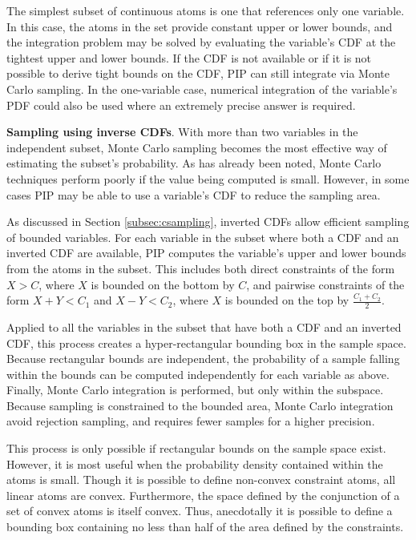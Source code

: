 The simplest subset of continuous atoms is one that references only one variable.  In this case, the atoms in the set provide constant upper or lower bounds, and the integration problem may be solved by evaluating the variable's CDF at the tightest upper and lower bounds.  If the CDF is not available or if it is not possible to derive tight bounds on the CDF, PIP can still integrate via Monte Carlo sampling.  In the one-variable case, numerical integration of the variable's PDF could also be used where an extremely precise answer is required.

{\bf Sampling using inverse CDFs}.
With more than two variables in the independent subset, Monte Carlo sampling becomes the most effective way of estimating the subset's probability.  As has already been noted, Monte Carlo techniques perform poorly if the value being computed is small.  However, in some cases PIP may be able to use a variable's CDF to reduce the sampling area.  

As discussed in Section \ref{subsec:csampling}, inverted CDFs allow efficient sampling of bounded variables.  For each variable in the subset where both a CDF and an inverted CDF are available, PIP computes the variable's upper and lower bounds from the atoms in the subset.  This includes both direct constraints of the form $X > C$, where $X$ is bounded on the bottom by $C$, and pairwise constraints of the form $X + Y < C_1$ and $X - Y < C_2$, where $X$ is bounded on the top by $\frac{C_1+C_2}{2}$.  

Applied to all the variables in the subset that have both a CDF and an inverted CDF, this process creates a hyper-rectangular bounding box in the sample space.  Because rectangular bounds are independent, the probability of a sample falling within the bounds can be computed independently for each variable as above.  Finally, Monte Carlo integration is performed, but only within the subspace.
%
%
Because  sampling is  constrained  to the  bounded  area, Monte  Carlo
integration avoid rejection sampling, and requires fewer samples for a
higher precision.

This  process is  only possible  if rectangular  bounds on  the sample
space exist.  However, it is  most useful when the probability density
contained within the atoms is  small.  Though it is possible to define
non-convex   constraint   atoms,   all   linear  atoms   are   convex.
Furthermore, the space  defined by the conjunction of  a set of convex
atoms is itself  convex.  Thus, anecdotally it is possible to
define a bounding box containing no less than half of the area defined
by the constraints.


